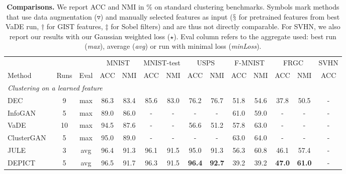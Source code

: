 \documentclass{article}
\begin{document}
\begin{table}
  \renewcommand{\arraystretch}{1}
  \addtolength{\tabcolsep}{-4pt}
  \caption{\textbf{Comparisons.}
    We report ACC and NMI in \% on standard clustering benchmarks.  Symbols mark methods that 
    use data augmentation ($\triangledown$) and manually selected features as input 
    ($\mathsection$ for pretrained features from best VaDE run, $\dagger$ for GIST features, 
  $\ddagger$ for Sobel filters) and are thus not directly comparable. For SVHN, we also 
  report our results with our Gaussian weighted loss ($\star$). Eval column refers to the 
  aggregate used: best run (\textit{max}), average (\textit{avg}) or run with minimal loss 
  (\textit{minLoss}).
}
  \vspace{0.2em}
  \centering
  \scriptsize
  \begin{tabular}{@{}lccccccccccccc@{}} \toprule
  &  & & \multicolumn{2}{c}{MNIST} & \multicolumn{2}{c}{MNIST-test} &
  \multicolumn{2}{c}{USPS} & \multicolumn{2}{c}{F-MNIST} & \multicolumn{2}{c}{FRGC} & SVHN\\
  \cmidrule(lr){4-5}  \cmidrule(lr){6-7}  \cmidrule(lr){8-9} \cmidrule(lr){10-11} 
  \cmidrule(lr){12-13} \cmidrule(ll){14-14}
  Method & Runs & Eval & ACC & NMI & ACC & NMI & ACC & NMI & ACC & NMI & ACC & NMI & ACC\\
  \midrule
  \multicolumn{13}{l}{\textit{Clustering on a learned feature}} \\
  \quad DEC~\cite{xieUnsupervisedDeepEmbedding2016, yangDeepSpectralClustering2019} & 9 & max 
  & 86.3 & 83.4 & 85.6 & 83.0 & 76.2 & 76.7 & 51.8 & 54.6 & 37.8 & 50.5 & - \\
  \quad InfoGAN~\cite{chenInfoGANInterpretableRepresentation2016, 
  mukherjeeClusterGANLatentSpace2019} & 5 & max &
  89.0 & 86.0 & - & - & - & - & 61.0 & 59.0 & - & - & - \\
  \quad VaDE~\cite{jiangVariationalDeepEmbedding2017, yangDeepSpectralClustering2019} & 10 & 
  max & 94.5 & 87.6 & - & - & 56.6 & 51.2 & 57.8 & 63.0 & - & - & - \\
  \quad ClusterGAN~\cite{mukherjeeClusterGANLatentSpace2019} & 5 & max &
  95.0 & 89.0 & - & - & - & - & 63.0 & 64.0 & - & - & - \\
  \quad JULE~\cite{yangJointUnsupervisedLearning2016} & 3 & avg &
  96.4 & 91.3 & 96.1 & 91.5 & 95.0 & 91.3 & 56.3 & 60.8 & 46.1 & 57.4 & -\\
  \quad DEPICT~\cite{dizajiDeepClusteringJoint2017} & 5 & avg &
  96.5 & 91.7 & 96.3 & 91.5 &\bf 96.4 &\bf 92.7 & 39.2 & 39.2 &\bf 47.0 &\bf 61.0 & - \\

\end{tabular}
\end{table}
\end{document}

